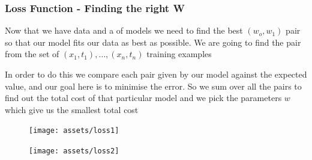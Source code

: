 
		\subsubsection{Loss Function - Finding the right W}

			\par{Now that we have data and a  of models we need to find the best $(w_o, w_1)$ pair so that our model fits our data as best as possible. We are going to find the pair from the set of $(x_1,t_1), \dots, (x_n,t_n)$ training examples}

			\par{In order to do this we compare each pair given by our model against the expected value, and our goal here is to minimise the error. So we sum over all the pairs to find out the total cost of that particular model and we pick the parameters $w$ which give us the smallest total cost}




			\begin{minipage}{\linewidth}
			\centering
			\begin{minipage}{0.45\linewidth}
			\begin{figure}[H]
			\texttt{[image: assets/loss1]}
			\end{figure}
			\end{minipage}
			\hspace{0.05\linewidth}
			\begin{minipage}{0.45\linewidth}
			\begin{figure}[H]
			\texttt{[image: assets/loss2]}
			\end{figure}
			\end{minipage}
			\end{minipage}



